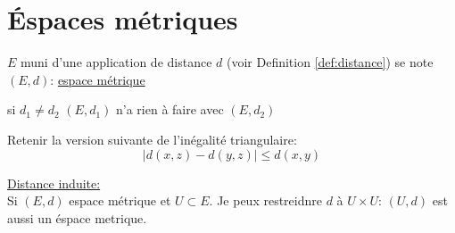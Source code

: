 \chapter{Éspaces métriques}
\begin{definition}
    $E$ muni d'une application de distance $d$ (voir Definition \ref{def:distance}) se note  $(E, d)$: \underline{espace métrique}
\end{definition}
\begin{remark}
   si $d_1 \neq d_2$ $(E, d_1)$ n'a rien à faire avec  $(E, d_2)$ 
\end{remark}
\begin{remark}
    Retenir la version suivante de l'inégalité triangulaire:
    \[
        |d(x, z) - d(y, z)| \le d(x, y)
    \] 
\end{remark}
\begin{remark}
    \underline{Distance induite:}\\
    Si $(E, d)$ espace métrique et  $U \subset E$. Je peux restreidnre $d$ à  $U \times U$:  $(U, d)$ est aussi un éspace metrique.
\end{remark}
